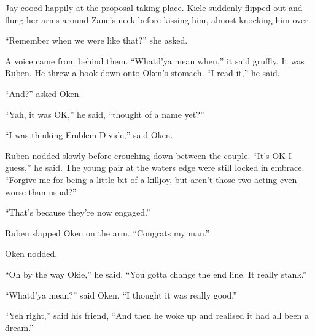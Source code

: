 Jay cooed happily at the proposal taking place.  Kiele suddenly flipped out and flung her arms around Zane's neck before kissing him, almost knocking him over.

``Remember when we were like that?'' she asked.  

A voice came from behind them.  ``Whatd'ya mean when,'' it said gruffly.  It was Ruben.  He threw a book down onto Oken's stomach.  ``I read it,'' he said.

``And?'' asked Oken.

``Yah, it was OK,'' he said, ``thought of a name yet?''

``I was thinking Emblem Divide,'' said Oken.

Ruben nodded slowly before crouching down between the couple.  ``It's OK I guess,'' he said.  The young pair at the waters edge were still locked in embrace.  ``Forgive me for being a little bit of a killjoy, but aren't those two acting even worse than usual?''

``That's because they're now engaged.''  

Ruben slapped Oken on the arm.  ``Congrats my man.''

Oken nodded.

``Oh by the way Okie,'' he said, ``You gotta change the end line.  It really stank.''

``Whatd'ya mean?'' said Oken.  ``I thought it was really good.''

``Yeh right,'' said his friend, ``And then he woke up and realised it had all been a dream.''

